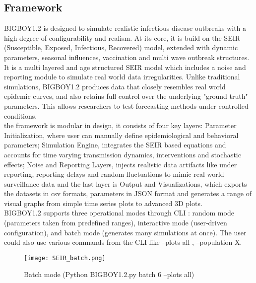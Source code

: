 \documentclass[11pt,a4paper]{article}
\theoremstyle{remark}\newtheorem{remark}{Remark}
\begin{document}
\subsection{Framework}
BIGBOY1.2 is designed to simulate realistic infectious disease outbreaks with a high degree of configurability and realism. At its core, it is build on the SEIR (Susceptible, Exposed, Infectious, Recovered) model, extended with dynamic parameters, seasonal influences, vaccination and multi wave outbreak structures. It is a multi layered and age structured SEIR model which includes a noise and reporting module to simulate real world data irregularities. Unlike traditional simulations, BIGBOY1.2 produces data that closely resembles real world epidemic curves, and also retains full control over the underlying "ground truth" parameters. This allows researchers to test forecasting methods under controlled conditions. \\
the framework is modular in design, it consists of four key layers: Parameter Initialization, where user can manually define epidemiological and behavioral parameters; Simulation Engine, integrates the SEIR based equations and accounts for time varying transmission dynamics, interventions and stochastic effects; Noise and Reporting Layers, injects realistic data artifacts like under reporting, reporting delays and random fluctuations to mimic real world surveillance data and the last layer is Output and Visualizations, which exports the datasets in csv formats, parameters in JSON format and generates a range of visual graphs from simple time series plots to advanced 3D plots. \\
BIGBOY1.2 supports three operational modes through CLI : random mode (parameters taken from predefined ranges), interactive mode (user-driven configuration), and batch mode (generates many simulations at once). The user could also use various commands from the CLI like --plots all , --population X.\\

\begin{figure}[H] 
    \centering
    \texttt{[image: SEIR\_batch.png]} 
    \caption{Batch mode (Python BIGBOY1.2.py batch 6 --plots all)}
    \label{fig:my_figure}
\end{figure}
\end{document}
